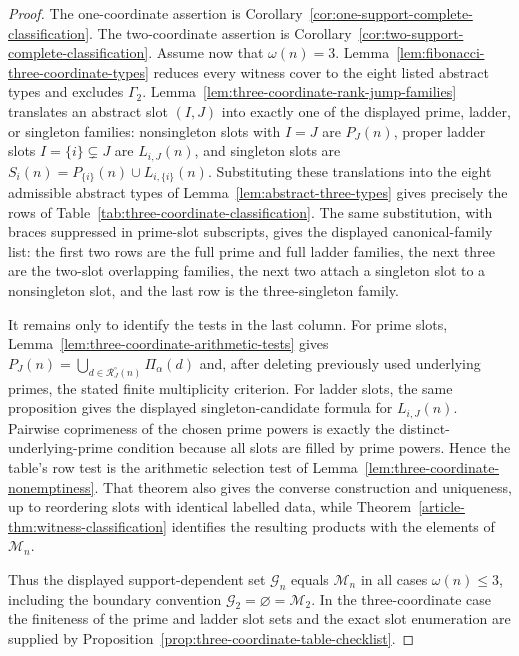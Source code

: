 \begin{proof}
The one-coordinate assertion is Corollary~\ref{cor:one-support-complete-classification}.
The two-coordinate assertion is Corollary~\ref{cor:two-support-complete-classification}.
Assume now that $\omega(n)=3$. Lemma~\ref{lem:fibonacci-three-coordinate-types}
reduces every witness cover to the eight listed abstract types and excludes
$\Gamma_2$. Lemma~\ref{lem:three-coordinate-rank-jump-families} translates
an abstract slot $(I,J)$ into exactly one of the displayed prime, ladder,
or singleton families: nonsingleton slots with $I=J$ are $P_J(n)$, proper
ladder slots $I=\{i\}\subsetneq J$ are $L_{i,J}(n)$, and singleton slots are
$S_i(n)=P_{\{i\}}(n)\cup L_{i,\{i\}}(n)$. Substituting these translations into
the eight admissible abstract types of Lemma~\ref{lem:abstract-three-types}
gives precisely the rows of Table~\ref{tab:three-coordinate-classification}.
The same substitution, with braces suppressed in prime-slot subscripts,
gives the displayed canonical-family list: the first two rows are the full
prime and full ladder families, the next three are the two-slot overlapping
families, the next two attach a singleton slot to a nonsingleton slot, and the
last row is the three-singleton family.

It remains only to identify the tests in the last column. For prime slots,
Lemma~\ref{lem:three-coordinate-arithmetic-tests} gives
$P_J(n)=\bigcup_{d\in\mathcal R_J^\circ(n)}\Pi_\alpha(d)$ and, after deleting
previously used underlying primes, the stated finite multiplicity criterion.
For ladder slots, the same proposition gives the displayed singleton-candidate
formula for $L_{i,J}(n)$. Pairwise coprimeness of the chosen prime powers is
exactly the distinct-underlying-prime condition because all slots are filled by
prime powers. Hence the table's row test is the arithmetic selection test of
Lemma~\ref{lem:three-coordinate-nonemptiness}. That theorem also gives the
converse construction and uniqueness, up to reordering slots with identical
labelled data, while Theorem~\ref{article-thm:witness-classification} identifies the
resulting products with the elements of $\mathcal M_n$.

Thus the displayed support-dependent set $\mathcal G_n$ equals
$\mathcal M_n$ in all cases $\omega(n)\le3$, including the boundary convention
$\mathcal G_2=\varnothing=\mathcal M_2$.  In the three-coordinate case the
finiteness of the prime and ladder slot sets and the exact slot enumeration
are supplied by Proposition~\ref{prop:three-coordinate-table-checklist}.
\end{proof}

